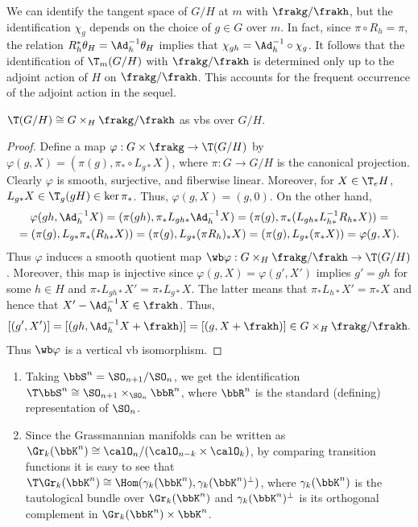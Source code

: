 We can identify the tangent space of $G\slash H$ at $m$ with $\frakg\slash\frakh$, but the identification $\chi_g$ depends on the choice of $g\in G$ over $m$. In fact, since $\pi\circ R_h=\pi$, the relation $R_h^\ast \theta_H=\Ad_h^{-1}\theta_H$ implies that $\chi_{gh}=\Ad_h^{-1}\circ \chi_g$. It follows that the identification of $\T_m(G\slash H)$ with $\frakg\slash \frakh$ is determined only up to the adjoint action of $H$ on $\frakg\slash\frakh$. This accounts for the frequent occurrence of the adjoint action in the sequel. 

\begin{prop}\label{prop 4.5.1 Sharpe}
    $\T(G\slash H)\cong G\times_H \frakg\slash\frakh$ as \glspl{vb} over $G\slash H$.
\end{prop}
\begin{proof}
    Define a map $\varphi:G\times \frakg\to \T(G\slash H)$ by $\varphi(g, X)=(\pi(g),\pi_\ast \circ L_{g\ast}X)$, where $\pi:G\to G\slash H$ is the canonical projection. Clearly $\varphi$ is smooth, surjective, and fiberwise linear. Moreover, for $X\in \T_eH$, $L_{g\ast}X\in \T_g(gH)\in\ker\pi_\ast$. Thus, $\varphi(g, X)=(g,0)$. On the other hand,
    \begin{multline}
        \varphi(gh,\Ad_h^{-1}X)=(\pi(gh),\pi_\ast L_{gh\ast}\Ad_h^{-1}X)=(\pi(g),\pi_\ast(L_{gh\ast}L_{h\ast}^{-1} R_{h\ast}X))=\\
        =(\pi(g),L_{g\ast }\pi_\ast (R_{h\ast}X))=(\pi(g),L_{g\ast}(\pi R_h)_\ast X)
        =(\pi(g),L_{g\ast}(\pi_\ast X))=\varphi(g,X).
    \end{multline}
    Thus $\varphi$ induces a smooth quotient map $\wb\varphi:G\times_H \frakg\slash\frakh\to \T(G\slash H)$. Moreover, this map is injective since $\varphi(g,X)=\varphi(g',X')$ implies $g'=gh$ for some $h\in H$ and $\pi_\ast L_{gh\ast}X'=\pi_\ast L_{g\ast}X$. The latter means that $\pi_\ast L_{h\ast}X'=\pi_\ast X$ and hence that $X'-\Ad_h^{-1}X\in\frakh$. Thus,
    \[[(g',X')]=[(gh,\Ad_h^{-1}X+\frakh)]=[(g,X+\frakh)]\in G\times_H\frakg\slash\frakh.\]
    Thus $\wb\varphi$ is a vertical \gls{vb} isomorphism.
\end{proof}


\begin{example}
    \begin{enumerate}
        \item Taking $\bbS^n=\SO_{n+1}\slash \SO_n$, we get the identification $\T\bbS^n\cong \SO_{n+1}\times_{\SO_n}\bbR^n$, where $\bbR^n$ is the standard (defining) representation of $\SO_n$.
        \item Since the Grassmannian manifolds can be written as $\Gr_k(\bbK^n)\cong \calO_n\slash (\calO_{n-k}\times \calO_{k})$, by comparing transition functions it is easy to see that $\T\Gr_k(\bbK^n)\cong \Hom(\gamma_k(\bbK^n),\gamma_k(\bbK^n)^\perp)$, where $\gamma_k(\bbK^n)$ is the tautological bundle over $\Gr_k(\bbK^n)$ and $\gamma_k(\bbK^n)^\perp$ is its orthogonal complement in $\Gr_k(\bbK^n)\times \bbK^n$.
    \end{enumerate}
\end{example}


